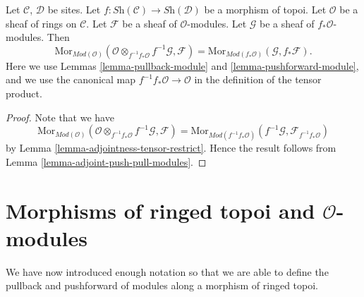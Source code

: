 \begin{lemma}
\label{lemma-adjoint-pull-push-modules}
Let $\mathcal{C}$, $\mathcal{D}$ be sites.
Let $f : \textit{Sh}(\mathcal{C}) \to \textit{Sh}(\mathcal{D})$
be a morphism of topoi.
Let $\mathcal{O}$ be a sheaf of rings on $\mathcal{C}$.
Let $\mathcal{F}$ be a sheaf of $\mathcal{O}$-modules.
Let $\mathcal{G}$ be a sheaf of $f_*\mathcal{O}$-modules.
Then
$$
\text{Mor}_{\textit{Mod}(\mathcal{O})}(
\mathcal{O} \otimes_{f^{-1}f_*\mathcal{O}} f^{-1}\mathcal{G}, \mathcal{F})
=
\text{Mor}_{\textit{Mod}(f_*\mathcal{O})}(\mathcal{G}, f_*\mathcal{F}).
$$
Here we use
Lemmas \ref{lemma-pullback-module}
and \ref{lemma-pushforward-module}, and we use
the canonical map $f^{-1}f_*\mathcal{O} \to \mathcal{O}$
in the definition of the tensor product.
\end{lemma}

\begin{proof}
Note that we have
$$
\text{Mor}_{\textit{Mod}(\mathcal{O})}(
\mathcal{O} \otimes_{f^{-1}f_*\mathcal{O}} f^{-1}\mathcal{G}, \mathcal{F})
=
\text{Mor}_{\textit{Mod}(f^{-1}f_*\mathcal{O})}(
f^{-1}\mathcal{G}, \mathcal{F}_{f^{-1}f_*\mathcal{O}})
$$
by Lemma \ref{lemma-adjointness-tensor-restrict}. Hence the result follows
from Lemma \ref{lemma-adjoint-push-pull-modules}.
\end{proof}






\section{Morphisms of ringed topoi and $\mathcal{O}$-modules}
\label{section-functoriality-modules}

\noindent
We have now introduced enough notation so that we are able to
define the pullback and pushforward of modules along a morphism
of ringed topoi.

